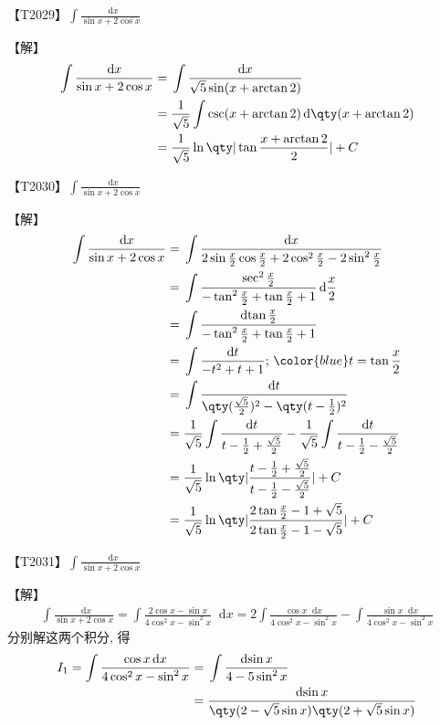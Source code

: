 \documentclass{ctexbook}
\newcommand*{\dif}{\mathop{}\!\mathrm{d}}
\begin{document}
{{\color{red}【T2029】}$\int\frac{\dif{x}}{\sin{x}+2\cos{x}}$\par
【解】
\begin{align*}
\int\frac{\dif{x}}{\sin{x}+2\cos{x}}={}&\int\frac{\dif{x}}{\sqrt{5}\sin(x+\arctan{2})}\\
={}&\frac{1}{\sqrt{5}}\int\csc(x+\arctan{2})\dif{\qty(x+\arctan{2})}\\
={}&\frac{1}{\sqrt{5}}\ln\qty|\tan{\frac{x+\arctan{2}}{2}}|+C
\end{align*}\par
{\color{red}【T2030】}$\int\frac{\dif{x}}{\sin{x}+2\cos{x}}$\par
【解】
\begin{align*}
\int\frac{\dif{x}}{\sin{x}+2\cos{x}}={}&\int\frac{\dif{x}}{2\sin{\frac{x}{2}}\cos{\frac{x}{2}}+2\cos^{2}{\frac{x}{2}}-2\sin^{2}{\frac{x}{2}}}\\
={}&\int\frac{\sec^{2}\frac{x}{2}}{-\tan^{2}{\frac{x}{2}}+\tan{\frac{x}{2}}+1}\dif{\frac{x}{2}}\\
={}&\int\frac{\dif{\tan{\frac{x}{2}}}}{-\tan^{2}{\frac{x}{2}}+\tan{\frac{x}{2}}+1}\\
={}&\int\frac{\dif{t}}{-t^{2}+t+1};\,{\color{blue}t=\tan{\frac{x}{2}}}\\
={}&\int\frac{\dif{t}}{\qty(\frac{\sqrt{5}}{2})^{2}-\qty(t-\frac{1}{2})^{2}}\\
={}&\frac{1}{\sqrt{5}}\int\frac{\dif{t}}{t-\frac{1}{2}+\frac{\sqrt{5}}{2}}-\frac{1}{\sqrt{5}}\int\frac{\dif{t}}{t-\frac{1}{2}-\frac{\sqrt{5}}{2}}\\
={}&\frac{1}{\sqrt{5}}\ln\qty|\frac{t-\frac{1}{2}+\frac{\sqrt{5}}{2}}{t-\frac{1}{2}-\frac{\sqrt{5}}{2}}|+C\\
={}&\frac{1}{\sqrt{5}}\ln\qty|\frac{2\tan{\frac{x}{2}}-1+\sqrt{5}}{2\tan{\frac{x}{2}-1-\sqrt{5}}}|+C
\end{align*}\par
{\color{red}【T2031】}$\int\frac{\dif{x}}{\sin{x}+2\cos{x}}$\par
【解】
\begin{align*}
\int\frac{\dif{x}}{\sin{x}+2\cos{x}}=\int\frac{2\cos{x}-\sin{x}}{4\cos^{2}{x}-\sin^{2}{x}}\dif{x}=2\int\frac{\cos{x}\dif{x}}{4\cos^{2}{x}-\sin^{2}{x}}-\int\frac{\sin{x}\dif{x}}{4\cos^{2}{x}-\sin^{2}{x}}
\end{align*}
分别解这两个积分, 得
\begin{align*}
I_{1}=\int\frac{\cos{x}\dif{x}}{4\cos^{2}{x}-\sin^{2}{x}}={}&\int\frac{\dif{\sin{x}}}{4-5\sin^{2}{x}}\\
={}&\frac{\dif{\sin{x}}}{\qty(2-\sqrt{5}\sin{x})\qty(2+\sqrt{5}\sin{x})}\\

\end{align*}}
\end{document}
